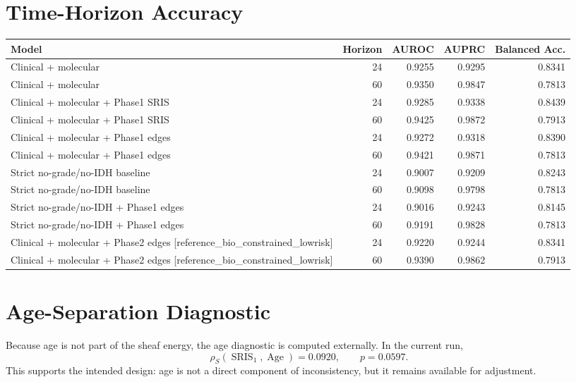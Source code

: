 \documentclass[11pt]{article}
\begin{document}
\section{Time-Horizon Accuracy}
\begin{longtable}{p{}rrrr}
\toprule
Model & Horizon & AUROC & AUPRC & Balanced Acc.\\
\midrule
Clinical + molecular & 24 & 0.9255 & 0.9295 & 0.8341\\
Clinical + molecular & 60 & 0.9350 & 0.9847 & 0.7813\\
Clinical + molecular + Phase1 SRIS & 24 & 0.9285 & 0.9338 & 0.8439\\
Clinical + molecular + Phase1 SRIS & 60 & 0.9425 & 0.9872 & 0.7913\\
Clinical + molecular + Phase1 edges & 24 & 0.9272 & 0.9318 & 0.8390\\
Clinical + molecular + Phase1 edges & 60 & 0.9421 & 0.9871 & 0.7813\\
Strict no-grade/no-IDH baseline & 24 & 0.9007 & 0.9209 & 0.8243\\
Strict no-grade/no-IDH baseline & 60 & 0.9098 & 0.9798 & 0.7813\\
Strict no-grade/no-IDH + Phase1 edges & 24 & 0.9016 & 0.9243 & 0.8145\\
Strict no-grade/no-IDH + Phase1 edges & 60 & 0.9191 & 0.9828 & 0.7813\\
Clinical + molecular + Phase2 edges [reference\_bio\_constrained\_lowrisk] & 24 & 0.9220 & 0.9244 & 0.8341\\
Clinical + molecular + Phase2 edges [reference\_bio\_constrained\_lowrisk] & 60 & 0.9390 & 0.9862 & 0.7913\\
\bottomrule
\end{longtable}

\section{Age-Separation Diagnostic}
Because age is not part of the sheaf energy, the age diagnostic is computed externally. In the current run,
\[
\rho_S(\operatorname{SRIS}_1,\operatorname{Age})=0.0920,
\qquad p=0.0597.
\]
This supports the intended design: age is not a direct component of inconsistency, but it remains available for adjustment.
\end{document}
